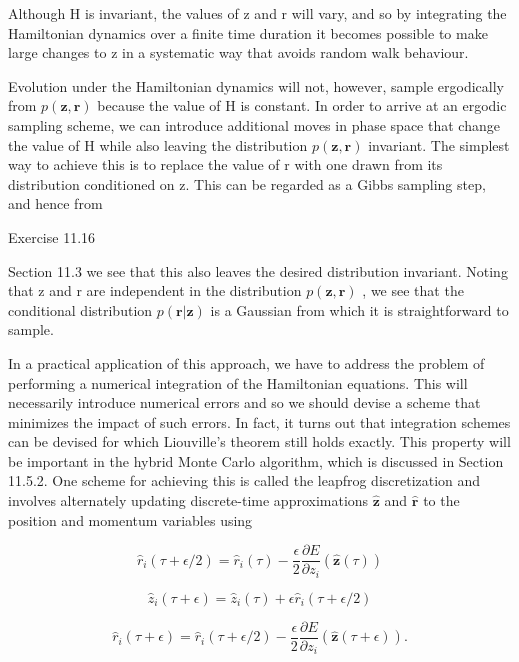 \documentclass[
  10
]{article}
\begin{document}
Although H is invariant, the values of z and r will vary, and so by
integrating the Hamiltonian dynamics over a finite time duration it
becomes possible to make large changes to z in a systematic way that
avoids random walk behaviour.

Evolution under the Hamiltonian dynamics will not, however, sample
ergodically from \(p ( \mathbf { z } , \mathbf { r } )\) because the
value of H is constant. In order to arrive at an ergodic sampling
scheme, we can introduce additional moves in phase space that change the
value of H while also leaving the distribution
\(p ( \mathbf { z } , \mathbf { r } )\) invariant. The simplest way to
achieve this is to replace the value of r with one drawn from its
distribution conditioned on z. This can be regarded as a Gibbs sampling
step, and hence from

Exercise 11.16

Section 11.3 we see that this also leaves the desired distribution
invariant. Noting that z and r are independent in the distribution
\(p ( \mathbf { z } , \mathbf { r } )\) , we see that the conditional
distribution \(p ( \mathbf { r } | \mathbf { z } )\) is a Gaussian from
which it is straightforward to sample.

In a practical application of this approach, we have to address the
problem of performing a numerical integration of the Hamiltonian
equations. This will necessarily introduce numerical errors and so we
should devise a scheme that minimizes the impact of such errors. In
fact, it turns out that integration schemes can be devised for which
Liouville's theorem still holds exactly. This property will be important
in the hybrid Monte Carlo algorithm, which is discussed in Section
11.5.2. One scheme for achieving this is called the leapfrog
discretization and involves alternately updating discrete-time
approximations \(\widehat { \mathbf { z } }\) and
\(\widehat { \mathbf { r } }\) to the position and momentum variables
using

\[
\widehat {r} _ {i} (\tau + \epsilon / 2) = \widehat {r} _ {i} (\tau) - \frac {\epsilon}{2} \frac {\partial E}{\partial z _ {i}} (\widehat {\mathbf {z}} (\tau))\tag{11.64}
\]

\[
\widehat {z} _ {i} (\tau + \epsilon) = \widehat {z} _ {i} (\tau) + \epsilon \widehat {r} _ {i} (\tau + \epsilon / 2)\tag{11.65}
\]

\[
\widehat {r} _ {i} (\tau + \epsilon) = \widehat {r} _ {i} (\tau + \epsilon / 2) - \frac {\epsilon}{2} \frac {\partial E}{\partial z _ {i}} (\widehat {\mathbf {z}} (\tau + \epsilon)).\tag{11.66}
\]
\end{document}
